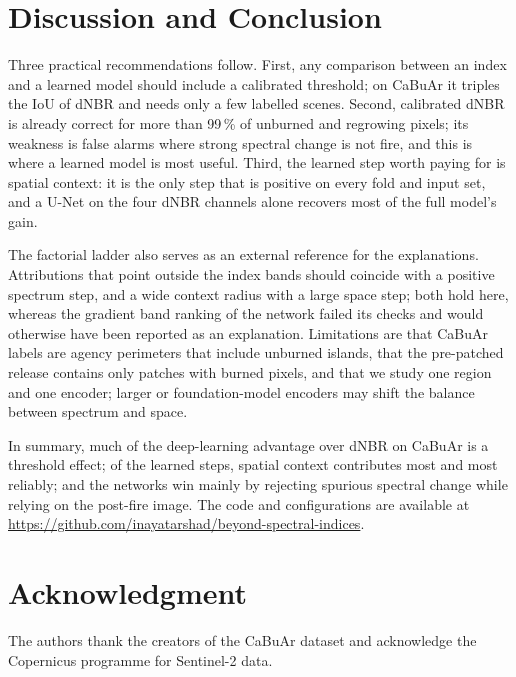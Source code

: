 \documentclass[conference]{IEEEtran}
\begin{document}
\section{Discussion and Conclusion}

Three practical recommendations follow. First, any comparison between an index and a learned model should include a calibrated threshold; on CaBuAr it triples the IoU of dNBR and needs only a few labelled scenes. Second, calibrated dNBR is already correct for more than 99\,\% of unburned and regrowing pixels; its weakness is false alarms where strong spectral change is not fire, and this is where a learned model is most useful. Third, the learned step worth paying for is spatial context: it is the only step that is positive on every fold and input set, and a U-Net on the four dNBR channels alone recovers most of the full model's gain.

The factorial ladder also serves as an external reference for the explanations. Attributions that point outside the index bands should coincide with a positive spectrum step, and a wide context radius with a large space step; both hold here, whereas the gradient band ranking of the network failed its checks and would otherwise have been reported as an explanation. Limitations are that CaBuAr labels are agency perimeters that include unburned islands, that the pre-patched release contains only patches with burned pixels, and that we study one region and one encoder; larger or foundation-model encoders may shift the balance between spectrum and space.

In summary, much of the deep-learning advantage over dNBR on CaBuAr is a threshold effect; of the learned steps, spatial context contributes most and most reliably; and the networks win mainly by rejecting spurious spectral change while relying on the post-fire image. The code and configurations are available at \url{https://github.com/inayatarshad/beyond-spectral-indices}.

\section*{Acknowledgment}
The authors thank the creators of the CaBuAr dataset and acknowledge the Copernicus programme for Sentinel-2 data.



\end{document}
